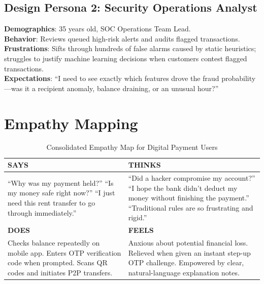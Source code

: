 \subsection{Design Persona 2: Security Operations Analyst}
\begin{tcolorbox}[colback=lightgraybg, colframe=primaryblue, title=\textbf{\color{white}Design Persona: Vikram Malhotra (Senior FinTech Fraud Analyst)}, arc=3pt]
\textbf{Demographics}: 35 years old, SOC Operations Team Lead.\\
\textbf{Behavior}: Reviews queued high-risk alerts and audits flagged transactions.\\
\textbf{Frustrations}: Sifts through hundreds of false alarms caused by static heuristics; struggles to justify machine learning decisions when customers contest flagged transactions.\\
\textbf{Expectations}: ``I need to see exactly which features drove the fraud probability—was it a recipient anomaly, balance draining, or an unusual hour?''
\end{tcolorbox}

\section{Empathy Mapping}
\begin{table}[h]
\centering
\caption{Consolidated Empathy Map for Digital Payment Users}
\label{tab:empathy_map}
\begin{tabularx}{\textwidth}{XX}
\toprule
\textbf{SAYS} & \textbf{THINKS} \\
\midrule
``Why was my payment held?''\newline
``Is my money safe right now?''\newline
``I just need this rent transfer to go through immediately.'' & 
``Did a hacker compromise my account?''\newline
``I hope the bank didn't deduct my money without finishing the payment.''\newline
``Traditional rules are so frustrating and rigid.'' \\
\midrule
\textbf{DOES} & \textbf{FEELS} \\
\midrule
Checks balance repeatedly on mobile app.\newline
Enters OTP verification code when prompted.\newline
Scans QR codes and initiates P2P transfers. & 
Anxious about potential financial loss.\newline
Relieved when given an instant step-up OTP challenge.\newline
Empowered by clear, natural-language explanation notes. \\
\bottomrule
\end{tabularx}
\end{table}

